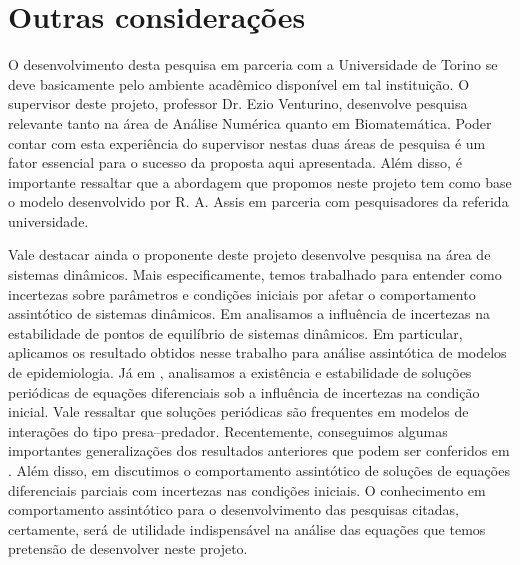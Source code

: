 \documentclass[
	12pt,				%
	openany,			%
	oneoside,			%
	a4paper,			%
	english,			%
	spanish,			%
	brazil,				%
	]{abntex2}
\begin{document}
\chapter{Outras considerações}

O desenvolvimento desta pesquisa em parceria com a Universidade de Torino se deve basicamente pelo ambiente acadêmico disponível em tal instituição. O supervisor deste projeto, professor Dr. Ezio Venturino, desenvolve pesquisa relevante tanto na área de  Análise Numérica quanto em Biomatemática. Poder contar com esta experiência do supervisor nestas duas áreas de pesquisa é um fator essencial para o sucesso da proposta aqui apresentada. Além disso,  é importante ressaltar que a abordagem que propomos neste projeto tem como base o modelo desenvolvido por R. A. Assis \cite{Assis20121507} em parceria com pesquisadores da referida universidade. 

Vale destacar ainda o proponente deste projeto desenvolve pesquisa na área de sistemas dinâmicos. Mais especificamente, temos trabalhado para entender como incertezas sobre parâmetros e condições iniciais por afetar o comportamento assintótico de sistemas dinâmicos. Em \cite{Cecconello2014106} analisamos a influência de incertezas na estabilidade de pontos de equilíbrio de sistemas dinâmicos. Em particular, aplicamos os resultado obtidos nesse trabalho para análise assintótica de modelos de epidemiologia. Já em \cite{Cecconello201321}, analisamos a existência e estabilidade  de soluções periódicas de equações diferenciais sob a influência de incertezas na condição inicial. Vale ressaltar que soluções periódicas são frequentes em modelos de interações do tipo presa--predador. Recentemente, conseguimos algumas importantes generalizações dos resultados anteriores que podem ser conferidos em \cite{Cecconello201599}. Além disso, em \cite{jeff} discutimos o comportamento assintótico de soluções de equações diferenciais parciais com incertezas nas condições iniciais. O conhecimento em comportamento assintótico para o desenvolvimento das pesquisas citadas, certamente, será de utilidade indispensável na análise das equações que temos pretensão de desenvolver neste projeto.
\end{document}
